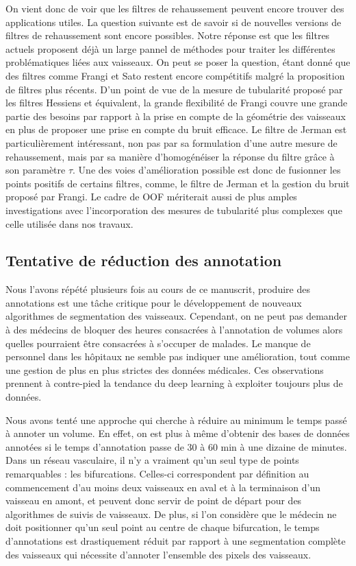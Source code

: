 On vient donc de voir que les filtres de rehaussement peuvent encore trouver des applications utiles. La question suivante est de savoir si de nouvelles versions de filtres de rehaussement sont encore possibles. Notre réponse est que les filtres actuels proposent déjà un large pannel de méthodes pour traiter les différentes problématiques liées aux vaisseaux. On peut se poser la question, étant donné que des filtres comme Frangi et Sato restent encore compétitifs malgré la proposition de filtres plus récents. D'un point de vue de la mesure de tubularité proposé par les filtres Hessiens et équivalent, la grande flexibilité de Frangi couvre une grande partie des besoins par rapport à la prise en compte de la géométrie des vaisseaux en plus de proposer une prise en compte du bruit efficace. Le filtre de Jerman est particulièrement intéressant, non pas par sa formulation d'une autre mesure de rehaussement, mais par sa manière d'homogénéiser la réponse du filtre grâce à son paramètre $\tau$. Une des voies d'amélioration possible est donc de fusionner les points positifs de certains filtres, comme, le filtre de Jerman et la gestion du bruit proposé par Frangi. Le cadre de OOF mériterait aussi de plus amples investigations avec l'incorporation des mesures de tubularité plus complexes que celle utilisée dans nos travaux.

\subsection{Tentative de réduction des annotation}

Nous l'avons répété plusieurs fois au cours de ce manuscrit, produire des annotations est une tâche critique pour le développement de nouveaux algorithmes de segmentation des vaisseaux. Cependant, on ne peut pas demander à des médecins de bloquer des heures consacrées à l'annotation de volumes alors quelles pourraient être consacrées à s'occuper de malades. Le manque de personnel dans les hôpitaux ne semble pas indiquer une amélioration, tout comme une gestion de plus en plus strictes des données médicales. Ces observations prennent à contre-pied la tendance du deep learning à exploiter toujours plus de données.

Nous avons tenté une approche qui cherche à réduire au minimum le temps passé à annoter un volume. En effet, on est plus à même d'obtenir des bases de données annotées si le temps d'annotation passe de 30 à 60 min à une dizaine de minutes. Dans un réseau vasculaire, il n'y a vraiment qu'un seul type de points remarquables : les bifurcations. Celles-ci correspondent par définition au commencement d'au moins deux vaisseaux en aval et à la terminaison d'un vaisseau en amont, et peuvent donc servir de point de départ pour des algorithmes de suivis de vaisseaux. De plus, si l'on considère que le médecin ne doit positionner qu'un seul point au centre de chaque bifurcation, le temps d'annotations est drastiquement réduit par rapport à une segmentation complète des vaisseaux qui nécessite d'annoter l'ensemble des pixels des vaisseaux.
 
